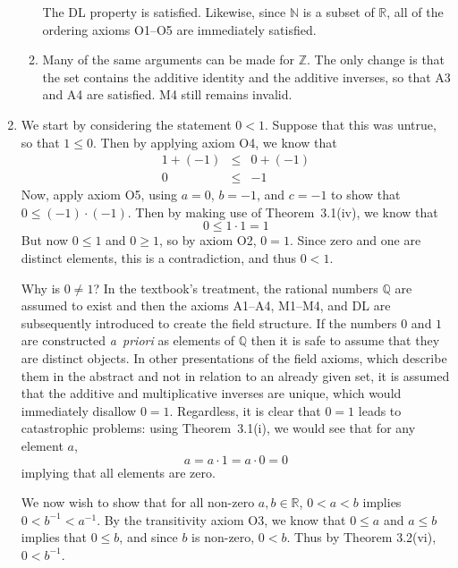 \documentclass[12pt,letterpaper]{article}
\newcommand{\N}{\mathbb{N}}
\newcommand{\Z}{\mathbb{Z}}
\newcommand{\Q}{\mathbb{Q}}
\newcommand{\R}{\mathbb{R}}
\begin{document}
\begin{enumerate}
\begin{enumerate}
	The DL property is satisfied. Likewise, since $\N$ is a subset of $\R$,
	all of the ordering axioms O1--O5 are immediately satisfied.
      \item Many of the same arguments can be made for $\Z$. The only change is
	that the set contains the additive identity and the additive inverses,
	so that A3 and A4 are satisfied. M4 still remains invalid.
    \end{enumerate}
  \item We start by considering the statement $0<1$. Suppose that this was untrue,
    so that $1 \le 0$. Then by applying axiom O4, we know that
    \begin{eqnarray*}
      1 + (-1) &\le& 0 + (-1) \\
      0 &\le& -1
    \end{eqnarray*}
    Now, apply axiom O5, using $a=0$, $b=-1$, and $c=-1$ to show that $0 \le
    (-1)\cdot(-1)$. Then by making use of Theorem~3.1(iv), we know that
    \[
      0 \le 1 \cdot 1 = 1
    \]
    But now $0 \le 1$ and $0 \ge 1$, so by axiom O2, $0=1$. Since zero and one
    are distinct elements, this is a contradiction, and thus $0<1$.
   
    Why is $0 \ne 1$? In the textbook's treatment, the rational numbers $\Q$
    are assumed to exist and then the axioms A1--A4, M1--M4, and DL are
    subsequently introduced to create the field structure. If the numbers $0$
    and $1$ are constructed {\it a~priori} as elements of $\Q$ then it is safe
    to assume that they are distinct objects. In other presentations of the
    field axioms, which describe them in the abstract and not in relation to an
    already given set, it is assumed that the additive and multiplicative
    inverses are unique, which would immediately disallow $0=1$. Regardless, it
    is clear that $0=1$ leads to catastrophic problems: using Theorem~3.1(i),
    we would see that for any element $a$,
    \[
      a = a\cdot 1 = a\cdot 0 = 0
    \]
    implying that all elements are zero.

    We now wish to show that for all non-zero $a,b\in \R$, $0<a<b$ implies
    $0<b^{-1} < a^{-1}$. By the transitivity axiom O3, we know that $0\le a$
    and $a \le b$ implies that $0\le b$, and since $b$ is non-zero, $0<b$. Thus
    by Theorem 3.2(vi), $0<b^{-1}$.
    

\end{enumerate}
\end{document}
